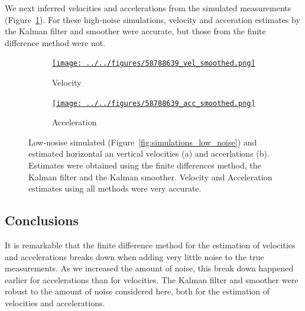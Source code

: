 \documentclass[12pt]{article}
\begin{document}
We next inferred velocities and accelerations from the simulated measurements
(Figure~\ref{fig:vel_acc_high_noise}).  For these high-noise simulations,
velocity and acceration estimates by the Kalman filter and smoother were
accurate, but those from the finite difference method were not.

\begin{figure}

    \begin{subfigure}{\textwidth}
        \centering
        \href{http://www.gatsby.ucl.ac.uk/~rapela/fwg/lds_repo/inference/figures/58788639_vel_smoothed.html}{\texttt{[image: ../../figures/58788639\_vel\_smoothed.png]}}
        \caption{Velocity}
    \end{subfigure}

    \begin{subfigure}{\textwidth}
        \centering
        \href{http://www.gatsby.ucl.ac.uk/~rapela/fwg/lds_repo/inference/figures/58788639_acc_smoothed.html}{\texttt{[image: ../../figures/58788639\_acc\_smoothed.png]}}
        \caption{Acceleration}
    \end{subfigure}

    \caption{Low-nosise simulated (Figure~\ref{fig:simulations_low_noise}) and
    estimated horizontal an vertical velocities (a) and accerlations (b).
    Estimates were obtained using the finite differences method, the Kalman
    filter and the Kalman smoother. Velocity and Acceleration estimates using
    all methods were very accurate.}

    \label{fig:vel_acc_high_noise}

\end{figure}

\subsection{Conclusions}

It is remarkable that the finite difference method for the estimation of
velocities and accelerations breaks down when adding very little noise to the
true measurements. As we increased the amount of noise, this break down
happened earlier for accelerations than for velocities.
%
The Kalman filter and smoother were robust to the amount of noise considered
here, both for the estimation of velocities and accelerations.



\end{document}
